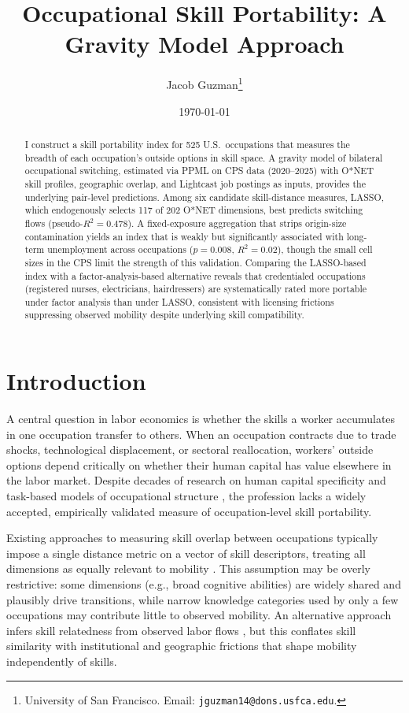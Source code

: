\documentclass[12pt]{article}
\title{Occupational Skill Portability: A Gravity Model Approach}
\author{Jacob Guzman\thanks{University of San Francisco. Email: \texttt{jguzman14@dons.usfca.edu}.}}
\date{\today}
\begin{document}
\maketitle

\begin{abstract}
I construct a skill portability index for 525 U.S.\ occupations that measures the breadth of each occupation's outside options in skill space. A gravity model of bilateral occupational switching, estimated via PPML on CPS data (2020--2025) with O*NET skill profiles, geographic overlap, and Lightcast job postings as inputs, provides the underlying pair-level predictions. Among six candidate skill-distance measures, LASSO, which endogenously selects 117 of 202 O*NET dimensions, best predicts switching flows (pseudo-$R^2 = 0.478$). A fixed-exposure aggregation that strips origin-size contamination yields an index that is weakly but significantly associated with long-term unemployment across occupations ($p = 0.008$, $R^2 = 0.02$), though the small cell sizes in the CPS limit the strength of this validation. Comparing the LASSO-based index with a factor-analysis-based alternative reveals that credentialed occupations (registered nurses, electricians, hairdressers) are systematically rated more portable under factor analysis than under LASSO, consistent with licensing frictions suppressing observed mobility despite underlying skill compatibility.
\end{abstract}

\section{Introduction}
\label{sec:intro}

A central question in labor economics is whether the skills a worker accumulates in one occupation transfer to others. When an occupation contracts due to trade shocks, technological displacement, or sectoral reallocation, workers' outside options depend critically on whether their human capital has value elsewhere in the labor market. Despite decades of research on human capital specificity \citep{becker1964,lazear2009} and task-based models of occupational structure \citep{autor2003,acemoglu2011}, the profession lacks a widely accepted, empirically validated measure of occupation-level skill portability.

Existing approaches to measuring skill overlap between occupations typically impose a single distance metric on a vector of skill descriptors, treating all dimensions as equally relevant to mobility \citep{poletaev2008,gathmann2010}. This assumption may be overly restrictive: some dimensions (e.g., broad cognitive abilities) are widely shared and plausibly drive transitions, while narrow knowledge categories used by only a few occupations may contribute little to observed mobility. An alternative approach infers skill relatedness from observed labor flows \citep{neffke2013}, but this conflates skill similarity with institutional and geographic frictions that shape mobility independently of skills.
\end{document}
